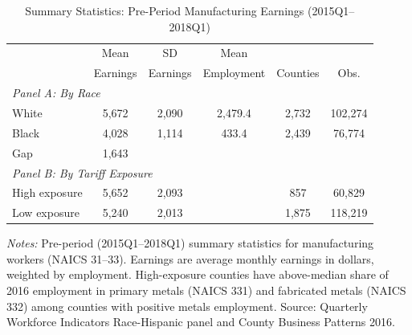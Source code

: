 \begin{table}
\begin{threeparttable}[htbp]
\centering
\caption{Summary Statistics: Pre-Period Manufacturing Earnings (2015Q1--2018Q1)}
\label{tab:summary}
\begin{tabular}{lccccc}
\toprule
 & Mean & SD & Mean & & \\
 & Earnings & Earnings & Employment & Counties & Obs. \\
\midrule
\multicolumn{6}{l}{\textit{Panel A: By Race}} \\[3pt]
White & 5,672 & 2,090 & 2,479.4 & 2,732 & 102,274 \\
Black & 4,028 & 1,114 & 433.4 & 2,439 & 76,774 \\
Gap & 1,643 & & & & \\
\midrule
\multicolumn{6}{l}{\textit{Panel B: By Tariff Exposure}} \\[3pt]
High exposure & 5,652 & 2,093 & & 857 & 60,829 \\
Low exposure & 5,240 & 2,013 & & 1,875 & 118,219 \\
\bottomrule
\end{tabular}
\begin{tablenotes}
\small
\item \textit{Notes:} Pre-period (2015Q1--2018Q1) summary statistics for manufacturing workers (NAICS 31--33). Earnings are average monthly earnings in dollars, weighted by employment. High-exposure counties have above-median share of 2016 employment in primary metals (NAICS 331) and fabricated metals (NAICS 332) among counties with positive metals employment. Source: Quarterly Workforce Indicators Race-Hispanic panel and County Business Patterns 2016.
\end{tablenotes}
\end{threeparttable}
\end{table}
